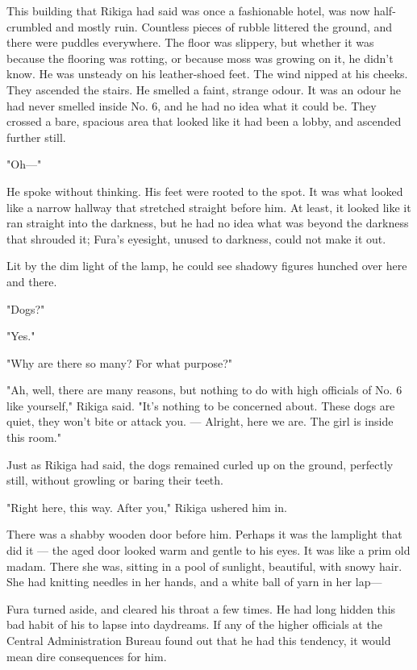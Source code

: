 This building that Rikiga had said was once a fashionable hotel, was now
half-crumbled and mostly ruin. Countless pieces of rubble littered the
ground, and there were puddles everywhere. The floor was slippery, but
whether it was because the flooring was rotting, or because moss was
growing on it, he didn't know. He was unsteady on his leather-shoed
feet. The wind nipped at his cheeks. They ascended the stairs. He
smelled a faint, strange odour. It was an odour he had never smelled
inside No. 6, and he had no idea what it could be. They crossed a bare,
spacious area that looked like it had been a lobby, and ascended further
still.

"Oh---"

He spoke without thinking. His feet were rooted to the spot. It was what
looked like a narrow hallway that stretched straight before him. At
least, it looked like it ran straight into the darkness, but he had no
idea what was beyond the darkness that shrouded it; Fura's eyesight,
unused to darkness, could not make it out.

Lit by the dim light of the lamp, he could see shadowy figures hunched
over here and there.

"Dogs?"

"Yes."

"Why are there so many? For what purpose\el ?"

"Ah, well, there are many reasons, but nothing to do with high officials
of No. 6 like yourself," Rikiga said. "It's nothing to be concerned
about. These dogs are quiet, they won't bite or attack you. --- Alright,
here we are. The girl is inside this room."

Just as Rikiga had said, the dogs remained curled up on the ground,
perfectly still, without growling or baring their teeth.

"Right here, this way. After you," Rikiga ushered him in.

There was a shabby wooden door before him. Perhaps it was the lamplight
that did it --- the aged door looked warm and gentle to his eyes. It was
like a prim old madam. There she was, sitting in a pool of sunlight,
beautiful, with snowy hair. She had knitting needles in her hands, and a
white ball of yarn in her lap---

Fura turned aside, and cleared his throat a few times. He had long
hidden this bad habit of his to lapse into daydreams. If any of the
higher officials at the Central Administration Bureau found out that he
had this tendency, it would mean dire consequences for him.

